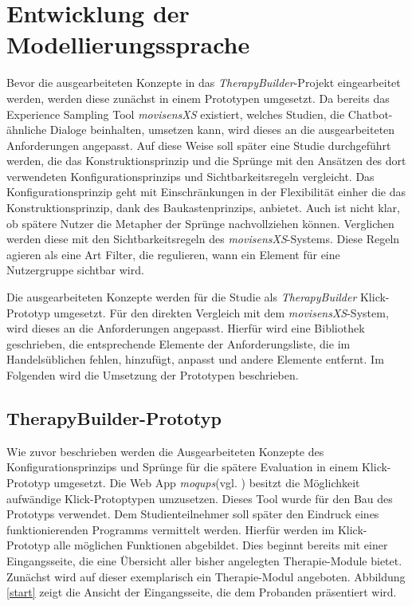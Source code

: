 \chapter{Entwicklung der Modellierungssprache}
\label{ch:Implementation}
Bevor die ausgearbeiteten Konzepte in das \emph{TherapyBuilder}-Projekt eingearbeitet werden, werden diese zunächst in einem Prototypen umgesetzt. Da bereits das Experience Sampling Tool \emph{movisensXS} existiert, welches Studien, die Chatbot-ähnliche Dialoge beinhalten, umsetzen kann, wird dieses an die ausgearbeiteten Anforderungen angepasst. Auf diese Weise soll später eine Studie durchgeführt werden, die das Konstruktionsprinzip und die Sprünge mit den Ansätzen des dort verwendeten Konfigurationsprinzips und Sichtbarkeitsregeln vergleicht. Das Konfigurationsprinzip geht mit Einschränkungen in der Flexibilität einher die das Konstruktionsprinzip, dank des Baukastenprinzips, anbietet. Auch ist nicht klar, ob spätere Nutzer die Metapher der Sprünge nachvollziehen können. Verglichen werden diese mit den Sichtbarkeitsregeln des \emph{movisensXS}-Systems. Diese Regeln agieren als eine Art Filter, die regulieren, wann ein Element für eine Nutzergruppe sichtbar wird. 

Die ausgearbeiteten Konzepte werden für die Studie als \emph{TherapyBuilder} Klick-Prototyp umgesetzt. Für den direkten Vergleich mit dem \emph{movisensXS}-System, wird dieses an die Anforderungen angepasst. Hierfür wird eine Bibliothek geschrieben, die entsprechende Elemente der Anforderungsliste, die im Handelsüblichen fehlen, hinzufügt, anpasst und andere Elemente entfernt. Im Folgenden wird die Umsetzung der Prototypen beschrieben.


\section{TherapyBuilder-Prototyp}
Wie zuvor beschrieben werden die Ausgearbeiteten Konzepte des Konfigurationsprinzips und Sprünge für die spätere Evaluation in einem Klick-Prototyp umgesetzt. Die Web App \emph{moqups}(vgl. \cite{OnlineMo52:online}) besitzt die Möglichkeit aufwändige Klick-Protoptypen umzusetzen. Dieses Tool wurde für den Bau des Prototyps verwendet. Dem Studienteilnehmer soll später den Eindruck eines funktionierenden Programms vermittelt werden. Hierfür werden im Klick-Prototyp alle möglichen Funktionen abgebildet. Dies beginnt bereits mit einer Eingangsseite, die eine Übersicht aller bisher angelegten Therapie-Module bietet. Zunächst wird auf dieser exemplarisch ein Therapie-Modul angeboten. Abbildung \ref{start} zeigt die Ansicht der Eingangsseite, die dem Probanden präsentiert wird. 

